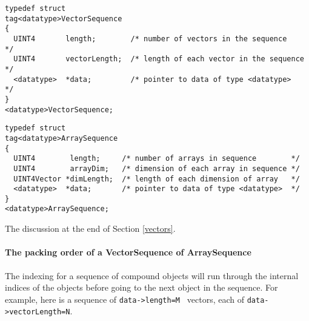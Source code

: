 \documentclass[]{ligodcc}
\begin{document}
{\footnotesize
\begin{verbatim}
typedef struct
tag<datatype>VectorSequence
{
  UINT4       length;        /* number of vectors in the sequence     */
  UINT4       vectorLength;  /* length of each vector in the sequence */
  <datatype>  *data;         /* pointer to data of type <datatype>    */
}
<datatype>VectorSequence;
\end{verbatim}}


{\footnotesize
\begin{verbatim}
typedef struct
tag<datatype>ArraySequence
{
  UINT4        length;     /* number of arrays in sequence        */
  UINT4        arrayDim;   /* dimension of each array in sequence */
  UINT4Vector *dimLength;  /* length of each dimension of array   */
  <datatype>  *data;       /* pointer to data of type <datatype>  */
}
<datatype>ArraySequence;
\end{verbatim}}

\noindent
The discussion at the end of Section \ref{vectors}.

\paragraph{The packing order of a VectorSequence of ArraySequence \\}
\label{packingorderAS} 

The indexing for a sequence of compound objects will run through the
internal indices of the objects before going to the next object in the
sequence. For example, here is a  sequence of {\tt data->length=M } 
vectors, each of {\tt data->vectorLength=N}.
\end{document}
